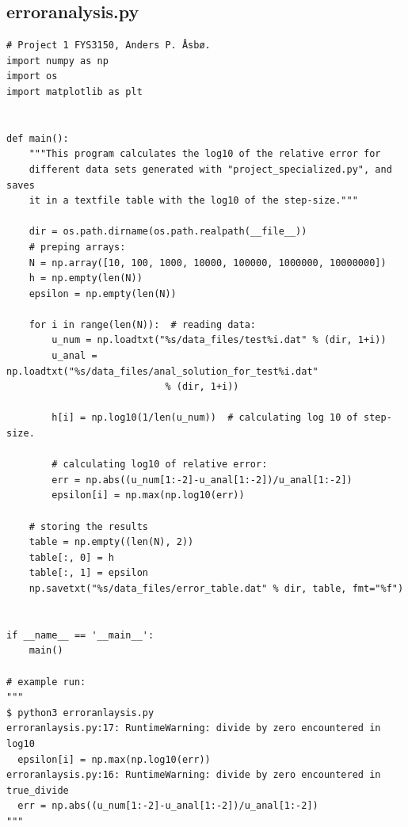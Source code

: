 \documentclass[english,notitlepage]{revtex4-1}  %
\begin{document}
\subsection{erroranalysis.py}\label{A:4}
\begin{lstlisting}
# Project 1 FYS3150, Anders P. Åsbø.
import numpy as np
import os
import matplotlib as plt


def main():
    """This program calculates the log10 of the relative error for
    different data sets generated with "project_specialized.py", and saves
    it in a textfile table with the log10 of the step-size."""

    dir = os.path.dirname(os.path.realpath(__file__))
    # preping arrays:
    N = np.array([10, 100, 1000, 10000, 100000, 1000000, 10000000])
    h = np.empty(len(N))
    epsilon = np.empty(len(N))

    for i in range(len(N)):  # reading data:
        u_num = np.loadtxt("%s/data_files/test%i.dat" % (dir, 1+i))
        u_anal = np.loadtxt("%s/data_files/anal_solution_for_test%i.dat"
                            % (dir, 1+i))

        h[i] = np.log10(1/len(u_num))  # calculating log 10 of step-size.

        # calculating log10 of relative error:
        err = np.abs((u_num[1:-2]-u_anal[1:-2])/u_anal[1:-2])
        epsilon[i] = np.max(np.log10(err))

    # storing the results
    table = np.empty((len(N), 2))
    table[:, 0] = h
    table[:, 1] = epsilon
    np.savetxt("%s/data_files/error_table.dat" % dir, table, fmt="%f")


if __name__ == '__main__':
    main()

# example run:
"""
$ python3 erroranlaysis.py
erroranlaysis.py:17: RuntimeWarning: divide by zero encountered in log10
  epsilon[i] = np.max(np.log10(err))
erroranlaysis.py:16: RuntimeWarning: divide by zero encountered in true_divide
  err = np.abs((u_num[1:-2]-u_anal[1:-2])/u_anal[1:-2])
"""

\end{lstlisting}

{}
\end{document}
